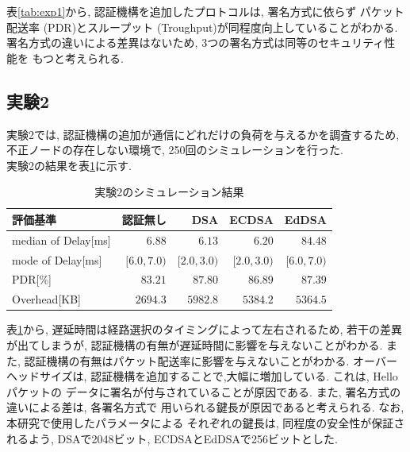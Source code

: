 \documentclass[a4j,9pt,twocolumn]{jsarticle}
\begin{document}
表\ref{tab:exp1}から, 認証機構を追加したプロトコルは, 署名方式に依らず
パケット配送率 (PDR)とスループット (Troughput)が同程度向上していることがわかる. 
署名方式の違いによる差異はないため, 3つの署名方式は同等のセキュリティ性能を
もつと考えられる. 

\subsection{実験2}
\indent 実験2では, 認証機構の追加が通信にどれだけの負荷を与えるかを調査するため, 
不正ノードの存在しない環境で, 250回のシミュレーションを行った. \\
\indent 実験2の結果を表\ref{tab:exp2}に示す. 
\vspace{-3mm}
\begin{table}[h]
    \centering
    \caption{実験2のシミュレーション結果}
    \label{tab:exp2} 
    \begin{tabular}{l|rrrr} \hline
        評価基準 & 認証無し & DSA & ECDSA & EdDSA \\ \hline \hline
        \footnotesize{median of Delay[ms]} & $6.88$ & $6.13$ & $6.20$ & $84.48$ \\
        \small{mode of Delay[ms]} & $[6.0, 7.0)$ & $[2.0, 3.0)$ & $[2.0, 3.0)$ & $[6.0, 7.0)$ \\
        PDR[\%] & $83.21$ & $87.80$ & $86.89$ & $87.39$ \\
        Overhead[KB] & $2694.3$ & $5982.8$ & $5384.2$ & $5364.5$ \\ \hline
    \end{tabular}
\end{table}

表\ref{tab:exp2}から, 遅延時間は経路選択のタイミングによって左右されるため, 
若干の差異が出てしまうが, 認証機構の有無が遅延時間に影響を与えないことがわかる. 
また, 認証機構の有無はパケット配送率に影響を与えないことがわかる. 
オーバーヘッドサイズは, 認証機構を追加することで,大幅に増加している. これは, Helloパケットの
データに署名が付与されていることが原因である. また, 署名方式の違いによる差は, 各署名方式で
用いられる鍵長が原因であると考えられる. なお, 本研究で使用したパラメータによる
それぞれの鍵長は, 同程度の安全性が保証されるよう, DSAで2048ビット, ECDSAとEdDSAで256ビットとした. 
\end{document}
